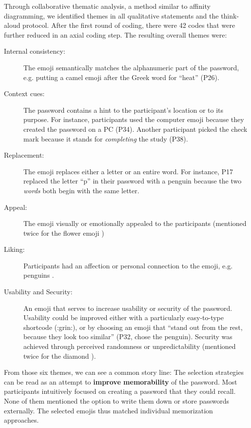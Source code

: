 Through collaborative thematic analysis, a method similar to affinity diagramming, we identified themes in all qualitative statements and the think-aloud protocol. After the first round of coding, there were 42 codes that were further reduced in an axial coding step. The resulting overall themes were:
\begin{description}
	\item[Internal consistency:] The emoji semantically matches the alphanumeric part of the password, e.g. putting a camel emoji  after the Greek word for ``heat'' (P26). 
	\item[Context cues:] The password contains a hint to the participant's location or to its purpose. For instance, participants used the computer emoji  because they created the password on a PC (P34). Another participant picked the check mark  because it stands for \textit{completing} the study (P38). 
	\item[Replacement:] The emoji replaces either a letter or an entire word. For instance, P17 replaced the letter ``p'' in their password with a penguin  because the two \textit{words} both begin with the same letter.
	\item[Appeal:] The emoji visually or emotionally appealed to the participants (mentioned twice for the flower emoji )
	\item[Liking:] Participants had an affection or personal connection to the emoji, e.g. penguins .
	\item[Usability and Security:] An emoji that serves to increase usability or security of the password. Usability could be improved either with a particularly easy-to-type shortcode (:grin:), or by choosing an emoji that ``stand out from the rest, because they look too similar'' (P32, chose the penguin). Security was achieved through perceived randomness or unpredictability (mentioned twice for the diamond ).
\end{description}

From those six themes, we can see a common story line: The selection strategies can be read as an attempt to \textbf{improve memorability} of the password. Most participants intuitively focused on creating a password that they could recall. None of them mentioned the option to write them down or store passwords externally. The selected emojis thus matched individual memorization approaches.

